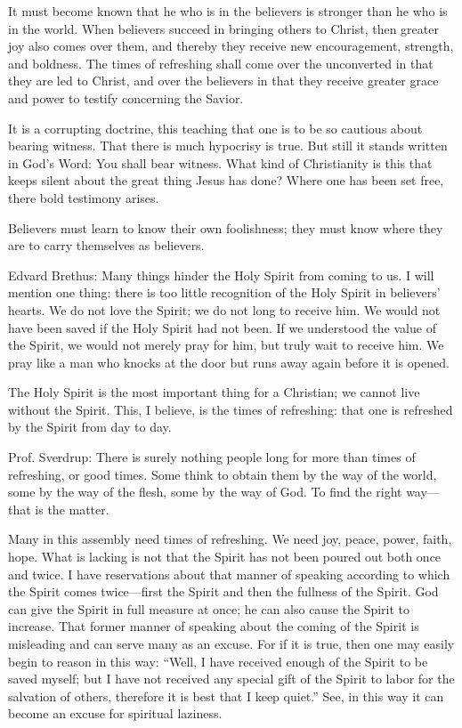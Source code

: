 It must become known that he who is in the believers is stronger than he who is in the world. When believers succeed in bringing others to Christ, then greater joy also comes over them, and thereby they receive new encouragement, strength, and boldness. The times of refreshing shall come over the unconverted in that they are led to Christ, and over the believers in that they receive greater grace and power to testify concerning the Savior.

It is a corrupting doctrine, this teaching that one is to be so cautious about bearing witness. That there is much hypocrisy is true. But still it stands written in God’s Word: You shall bear witness. What kind of Christianity is this that keeps silent about the great thing Jesus has done? Where one has been set free, there bold testimony arises.

Believers must learn to know their own foolishness; they must know where they are to carry themselves as believers.

Edvard Brethus: Many things hinder the Holy Spirit from coming to us. I will mention one thing: there is too little recognition of the Holy Spirit in believers’ hearts. We do not love the Spirit; we do not long to receive him. We would not have been saved if the Holy Spirit had not been. If we understood the value of the Spirit, we would not merely pray for him, but truly wait to receive him. We pray like a man who knocks at the door but runs away again before it is opened.

The Holy Spirit is the most important thing for a Christian; we cannot live without the Spirit. This, I believe, is the times of refreshing: that one is refreshed by the Spirit from day to day.

Prof. Sverdrup: There is surely nothing people long for more than times of refreshing, or good times. Some think to obtain them by the way of the world, some by the way of the flesh, some by the way of God. To find the right way—that is the matter.

Many in this assembly need times of refreshing. We need joy, peace, power, faith, hope. What is lacking is not that the Spirit has not been poured out both once and twice. I have reservations about that manner of speaking according to which the Spirit comes twice—first the Spirit and then the fullness of the Spirit. God can give the Spirit in full measure at once; he can also cause the Spirit to increase. That former manner of speaking about the coming of the Spirit is misleading and can serve many as an excuse. For if it is true, then one may easily begin to reason in this way: “Well, I have received enough of the Spirit to be saved myself; but I have not received any special gift of the Spirit to labor for the salvation of others, therefore it is best that I keep quiet.” See, in this way it can become an excuse for spiritual laziness.

